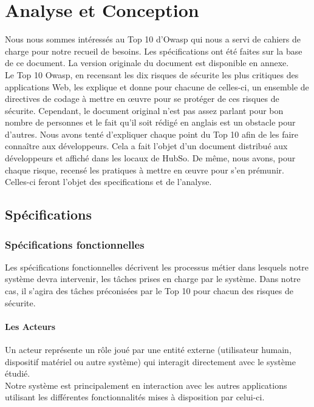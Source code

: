 \chapter{Analyse et Conception}
\minitoc
\clearpage
Nous nous sommes intéressés au Top 10 d'Owasp qui nous a servi de cahiers de charge pour notre recueil de besoins. Les spécifications ont été faites sur la base de ce document. La version originale du document est disponible en annexe.\\
Le Top 10 Owasp, en recensant les dix risques de sécurite les plus critiques des applications Web, les explique et donne pour chacune de celles-ci, un ensemble de directives de codage à mettre en œuvre pour se protéger de ces risques de sécurite. Cependant, le document original n'est pas assez parlant pour bon nombre de personnes et le fait qu'il soit rédigé en anglais est un obstacle pour d'autres. Nous avons tenté d'expliquer chaque point du Top 10 afin de les faire connaître aux développeurs. Cela a fait l'objet d'un document distribué aux développeurs et affiché dans les locaux de HubSo. De même, nous avons, pour chaque risque, recensé les pratiques à mettre en œuvre pour s'en prémunir. Celles-ci feront l'objet des specifications et de l'analyse.

\section{Spécifications}

\subsection{Spécifications fonctionnelles}
Les spécifications fonctionnelles décrivent les processus métier dans lesquels notre système devra intervenir, les tâches prises en charge par le système. Dans notre cas, il s'agira des tâches préconisées par le Top 10 pour chacun des risques de sécurite. 

\subsubsection{Les Acteurs}
Un acteur représente un rôle joué par une entité externe (utilisateur humain, dispositif matériel ou autre système) qui interagit directement avec le système étudié.\\
Notre système est principalement en interaction avec les autres applications utilisant les différentes fonctionnalités mises à disposition par celui-ci. 

